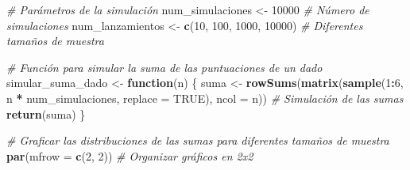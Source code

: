 \documentclass[
]{article}
\newenvironment{Shaded}{\begin{snugshade}}{\end{snugshade}}
\newcommand{\AttributeTok}[1]{\textcolor[rgb]{0.13,0.29,0.53}{#1}}
\newcommand{\CommentTok}[1]{\textcolor[rgb]{0.56,0.35,0.01}{\textit{#1}}}
\newcommand{\ConstantTok}[1]{\textcolor[rgb]{0.56,0.35,0.01}{#1}}
\newcommand{\ControlFlowTok}[1]{\textcolor[rgb]{0.13,0.29,0.53}{\textbf{#1}}}
\newcommand{\DecValTok}[1]{\textcolor[rgb]{0.00,0.00,0.81}{#1}}
\newcommand{\FunctionTok}[1]{\textcolor[rgb]{0.13,0.29,0.53}{\textbf{#1}}}
\newcommand{\NormalTok}[1]{#1}
\newcommand{\OtherTok}[1]{\textcolor[rgb]{0.56,0.35,0.01}{#1}}
\newcommand{\SpecialCharTok}[1]{\textcolor[rgb]{0.81,0.36,0.00}{\textbf{#1}}}
\begin{document}
\begin{Shaded}
\begin{Highlighting}[]
\CommentTok{\# Parámetros de la simulación}
\NormalTok{num\_simulaciones }\OtherTok{\textless{}{-}} \DecValTok{10000}  \CommentTok{\# Número de simulaciones}
\NormalTok{num\_lanzamientos }\OtherTok{\textless{}{-}} \FunctionTok{c}\NormalTok{(}\DecValTok{10}\NormalTok{, }\DecValTok{100}\NormalTok{, }\DecValTok{1000}\NormalTok{, }\DecValTok{10000}\NormalTok{)  }\CommentTok{\# Diferentes tamaños de muestra}

\CommentTok{\# Función para simular la suma de las puntuaciones de un dado}
\NormalTok{simular\_suma\_dado }\OtherTok{\textless{}{-}} \ControlFlowTok{function}\NormalTok{(n) \{}
\NormalTok{  suma }\OtherTok{\textless{}{-}} \FunctionTok{rowSums}\NormalTok{(}\FunctionTok{matrix}\NormalTok{(}\FunctionTok{sample}\NormalTok{(}\DecValTok{1}\SpecialCharTok{:}\DecValTok{6}\NormalTok{, n }\SpecialCharTok{*}\NormalTok{ num\_simulaciones, }\AttributeTok{replace =} \ConstantTok{TRUE}\NormalTok{), }
                        \AttributeTok{ncol =}\NormalTok{ n))  }\CommentTok{\# Simulación de las sumas}
  \FunctionTok{return}\NormalTok{(suma)}
\NormalTok{\}}

\CommentTok{\# Graficar las distribuciones de las sumas para diferentes tamaños de muestra}
\FunctionTok{par}\NormalTok{(}\AttributeTok{mfrow =} \FunctionTok{c}\NormalTok{(}\DecValTok{2}\NormalTok{, }\DecValTok{2}\NormalTok{))  }\CommentTok{\# Organizar gráficos en 2x2}


\end{Highlighting}
\end{Shaded}
\end{document}
